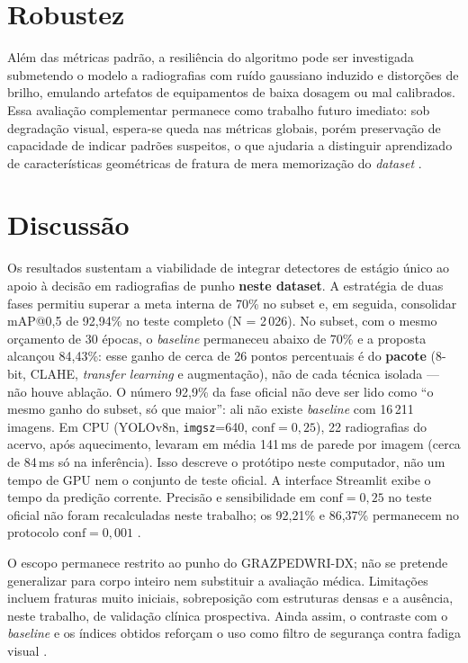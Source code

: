 \documentclass[12pt,oneside,a4paper,chapter=TITLE,section=TITLE,sumario=tradicional]{abntex2}
\begin{document}
\FloatBarrier

\section{Robustez}
\label{sec:robustez}

Além das métricas padrão, a resiliência do algoritmo pode ser investigada submetendo o modelo a radiografias com ruído gaussiano induzido e distorções de brilho, emulando artefatos de equipamentos de baixa dosagem ou mal calibrados. Essa avaliação complementar permanece como trabalho futuro imediato: sob degradação visual, espera-se queda nas métricas globais, porém preservação de capacidade de indicar padrões suspeitos, o que ajudaria a distinguir aprendizado de características geométricas de fratura de mera memorização do \textit{dataset} \cite{litjens2017survey}.

\section{Discussão}
\label{sec:discussao}

Os resultados sustentam a viabilidade de integrar detectores de estágio único ao apoio à decisão em radiografias de punho \textbf{neste dataset}. A estratégia de duas fases permitiu superar a meta interna de 70\% no subset e, em seguida, consolidar mAP@0,5 de 92,94\% no teste completo (N = 2\,026). No subset, com o mesmo orçamento de 30 épocas, o \textit{baseline} permaneceu abaixo de 70\% e a proposta alcançou 84,43\%: esse ganho de cerca de 26 pontos percentuais é do \textbf{pacote} (8-bit, CLAHE, \textit{transfer learning} e augmentação), não de cada técnica isolada --- não houve ablação. O número 92,9\% da fase oficial não deve ser lido como ``o mesmo ganho do subset, só que maior'': ali não existe \textit{baseline} com 16\,211 imagens. Em CPU (YOLOv8n, \texttt{imgsz}=640, $\mathrm{conf}=0{,}25$), 22 radiografias do acervo, após aquecimento, levaram em média 141\,ms de parede por imagem (cerca de 84\,ms só na inferência). Isso descreve o protótipo neste computador, não um tempo de GPU nem o conjunto de teste oficial. A interface Streamlit exibe o tempo da predição corrente. Precisão e sensibilidade em $\mathrm{conf}=0{,}25$ no teste oficial não foram recalculadas neste trabalho; os 92,21\% e 86,37\% permanecem no protocolo $\mathrm{conf}=0{,}001$ \cite{redmon2016you,kim2020}.

O escopo permanece restrito ao punho do GRAZPEDWRI-DX; não se pretende generalizar para corpo inteiro nem substituir a avaliação médica. Limitações incluem fraturas muito iniciais, sobreposição com estruturas densas e a ausência, neste trabalho, de validação clínica prospectiva. Ainda assim, o contraste com o \textit{baseline} e os índices obtidos reforçam o uso como filtro de segurança contra fadiga visual \cite{topol2019,kim2020}.
\end{document}
